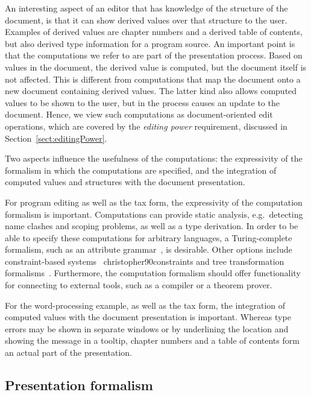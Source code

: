 \documentclass{speauth}
\begin{document}
An interesting aspect of an editor that has knowledge of the structure of the document, is that it can show derived values over that structure to the user. Examples of derived values are chapter numbers and a derived table of contents, but also derived type information for a program source. An important point is that the computations we refer to are part of the presentation process. Based on values in the document, the derived value is computed, but the document itself is not affected. This is different from computations that map the document onto a new document containing derived values. The latter kind also allows computed values to be shown to the user, but in the process causes an update to the document. Hence, we view such computations as document-oriented edit operations, which are covered by the {\em editing power} requirement, discussed in Section~\ref{sect:editingPower}.

Two aspects influence the usefulness of the computations: the expressivity of the formalism in which the computations are specified, and the integration of computed values and structures with the document presentation. 

For program editing as well as the tax form, the expressivity of the computation formalism is important. Computations can provide static analysis, e.g.\ detecting name clashes and scoping problems, as well as a type derivation. In order to be able to specify these computations for arbitrary languages, a Turing-complete formalism, such as an attribute grammar~\cite{swierstra04ag}, is desirable. Other options include constraint-based systems~\cite{ganzevoort92views,myers90garnet,borning81thinglab,ballance92pan} \bc christopher90constraints \ec and tree transformation formalisms~\cite{visser01stratego,xslt10}. Furthermore, the computation formalism should offer functionality for connecting to external tools, such as a compiler or a theorem prover.

For the word-processing example, as well as the tax form, the integration of computed values with the document presentation is important. Whereas type errors may be shown in separate windows or by underlining the location and showing the message in a tooltip, chapter numbers and a table of contents form an actual part of the presentation. 
					
\subsection{Presentation formalism} \label{sect:presentationFormalism}
\end{document}

